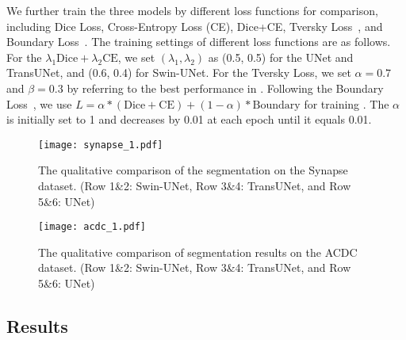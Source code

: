 \documentclass[runningheads]{llncs}
\begin{document}
We further train the three models by different loss functions for comparison, including Dice Loss, Cross-Entropy Loss (CE), Dice+CE, Tversky Loss~\cite{salehi2017tversky}, and Boundary Loss~\cite{kervadec2019boundary}. The training settings of different loss functions are as follows. For the $\lambda_1 \mbox{Dice}+\lambda_2 \mbox{CE}$, we set $(\lambda_1, \lambda_2)$ as (0.5, 0.5) for the UNet and TransUNet, and (0.6, 0.4) for Swin-UNet. For the Tversky Loss, we set $\alpha=0.7$ and $\beta=0.3$ by referring to the best performance in \cite{salehi2017tversky}. Following the Boundary Loss~\cite{kervadec2019boundary}, we use  $L = \alpha * (\mbox{Dice}+ \mbox{CE}) + (1 - \alpha) * \mbox{Boundary}$ for training . The $\alpha$ is initially set to 1 and decreases by 0.01 at each epoch until it equals 0.01.


\begin{figure}[t]
\texttt{[image: synapse\_1.pdf]}
\caption{The qualitative comparison of the segmentation on the Synapse dataset. (Row 1\&2: Swin-UNet, Row 3\&4: TransUNet, and Row 5\&6: UNet)} \label{synapse}
\end{figure}

\begin{figure}[t]
\texttt{[image: acdc\_1.pdf]}
\caption{The qualitative comparison of segmentation results on the ACDC dataset. (Row 1\&2: Swin-UNet, Row 3\&4: TransUNet, and Row 5\&6: UNet)} \label{acdc}
\end{figure}

\subsection{Results}

\end{document}
